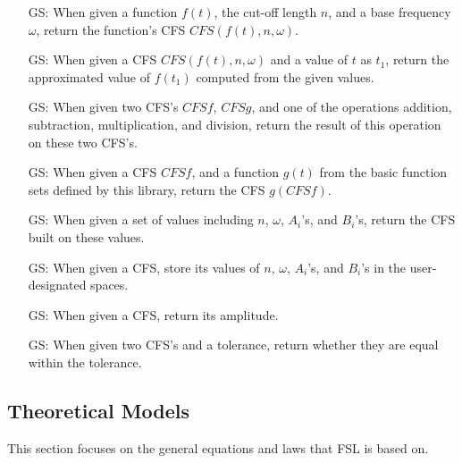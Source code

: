 \documentclass[12pt]{article}
\newcounter{goalnum} %
\newcommand{\famname}{FSL} %
\begin{document}
\begin{itemize}

\item[GS\refstepcounter{goalnum}\thegoalnum \label{GS:ConvertFromFunc}:] 
When given a function $f(t)$, the cut-off length $n$, and a base frequency 
$\omega$, return the function's CFS $\mathit{CFS}(f(t), n, \omega)$.
\item[GS\refstepcounter{goalnum}\thegoalnum \label{GS:FuncValue}:] 
When given a CFS $\mathit{CFS}(f(t), n, \omega)$ and a value of $t$ as $t_1$, 
return the approximated value of $f(t_1)$ computed from the given values.
\item[GS\refstepcounter{goalnum}\thegoalnum \label{GS:Operation}:] 
When given two CFS's $\mathit{CFSf}$, $\mathit{CFSg}$, and one of the 
operations addition, subtraction, multiplication, and division, return 
the result of this operation on these two CFS's.
\item[GS\refstepcounter{goalnum}\thegoalnum \label{GS:Function}:] 
When given a CFS $\mathit{CFSf}$, and a function $g(t)$ from the basic 
function sets defined by this library, return the CFS $g(CFSf)$. 
\item[GS\refstepcounter{goalnum}\thegoalnum \label{GS:ConvertFromOther}:] 
When given a set of values including $n$, $\omega$, $A_i$'s, and $B_i$'s, 
return the CFS built on these values.
\item[GS\refstepcounter{goalnum}\thegoalnum \label{GS:ConvertToOther}:] 
When given a CFS, store its values of $n$, $\omega$, $A_i$'s, and $B_i$'s 
in the user-designated spaces.
\item[GS\refstepcounter{goalnum}\thegoalnum \label{GS:Amp}:] When given 
a CFS, return its amplitude.
\item[GS\refstepcounter{goalnum}\thegoalnum \label{GS:ToleratedEquality}:] 
When given two CFS's and a tolerance, return whether they are equal 
within the tolerance.
\end{itemize}

\subsection{Theoretical Models} \label{sec_theoretical}

This section focuses on the general equations and laws that \famname{} is based
on.
~\newline
\end{document}

